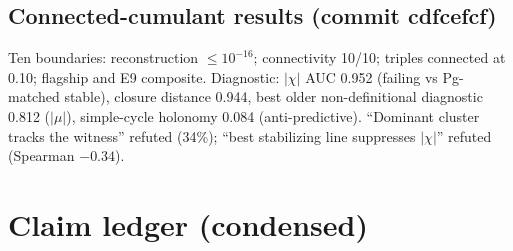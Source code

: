 \documentclass[10pt,a4paper]{article}
\theoremstyle{definition}
\begin{document}
\subsection{Connected-cumulant results (commit cdfcefcf)}
Ten boundaries: reconstruction $\le10^{-16}$; connectivity 10/10; triples connected at 0.10; flagship and E9
composite. Diagnostic: $|\chi|$ AUC 0.952 (failing vs Pg-matched stable), closure distance 0.944, best older
non-definitional diagnostic 0.812 ($|\mu|$), simple-cycle holonomy 0.084 (anti-predictive). ``Dominant
cluster tracks the witness'' refuted (34\%); ``best stabilizing line suppresses $|\chi|$'' refuted
(Spearman $-0.34$).

\section{Claim ledger (condensed)}\label{sec:ledger}
\small
\end{document}
